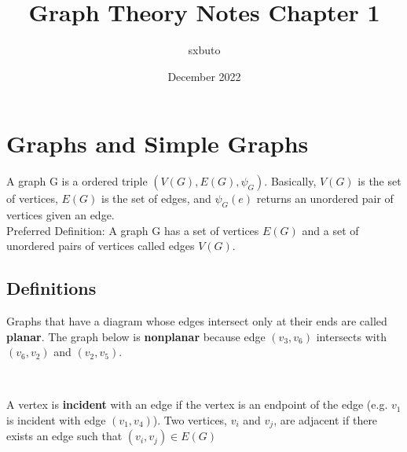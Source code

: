 \documentclass{article}
\title{Graph Theory Notes Chapter 1}
\author{sxbuto}
\date{December 2022}
\begin{document}
\maketitle

\section{Graphs and Simple Graphs}
A graph G is a ordered triple $(V(G), E(G), \psi_G)$. Basically,
$V(G)$ is the set of vertices, $E(G)$ is the
set of edges, and $\psi_G(e)$ returns an unordered pair of
vertices given an edge.\\
Preferred Definition: A graph G has a set of vertices $E(G)$
and a set of unordered pairs of vertices called edges $V(G)$.\\
\subsection{Definitions}
Graphs that have a diagram whose edges intersect only at their ends are
called \textbf{planar}.
The graph below is \textbf{nonplanar} because edge $(v_3, v_6)$ intersects
with $(v_6, v_2)$ and $(v_2, v_5)$.\\
\begin{center}
    \\
\end{center}
A vertex is \textbf{incident} with an edge if the vertex is an endpoint
of the edge (e.g. $v_1$ is incident with edge $(v_1, v_4)$). Two vertices,
$v_i$ and $v_j$, are adjacent if there exists an edge such that $(v_i, v_j)
\in E(G)$
\end{document}
